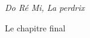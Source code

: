\documentclass[preview]{standalone}
\begin{document}
\begin{center}
\emph{Do Ré Mi, La perdrix}
    
Le chapitre final
\end{center}
\end{document}
